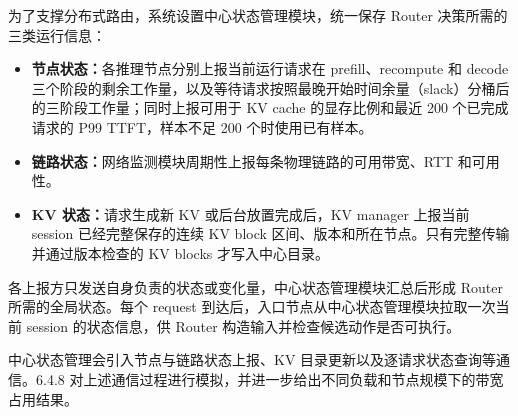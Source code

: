 为了支撑分布式路由，系统设置中心状态管理模块，统一保存 Router 决策所需的三类运行信息：
\begin{itemize}
    \item \textbf{节点状态：}各推理节点分别上报当前运行请求在 prefill、recompute 和 decode 三个阶段的剩余工作量，以及等待请求按照最晚开始时间余量（slack）分桶后的三阶段工作量；同时上报可用于 KV cache 的显存比例和最近 200 个已完成请求的 P99 TTFT，样本不足 200 个时使用已有样本。
    \item \textbf{链路状态：}网络监测模块周期性上报每条物理链路的可用带宽、RTT 和可用性。
    \item \textbf{KV 状态：}请求生成新 KV 或后台放置完成后，KV manager 上报当前 session 已经完整保存的连续 KV block 区间、版本和所在节点。只有完整传输并通过版本检查的 KV blocks 才写入中心目录。
\end{itemize}
各上报方只发送自身负责的状态或变化量，中心状态管理模块汇总后形成 Router 所需的全局状态。每个 request 到达后，入口节点从中心状态管理模块拉取一次当前 session 的状态信息，供 Router 构造输入并检查候选动作是否可执行。

中心状态管理会引入节点与链路状态上报、KV 目录更新以及逐请求状态查询等通信。6.4.8 对上述通信过程进行模拟，并进一步给出不同负载和节点规模下的带宽占用结果。

